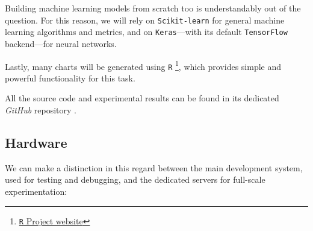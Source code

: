		Building machine learning models from scratch too is understandably out of the question. For this reason, we will rely on \texttt{Scikit-learn} for general machine learning algorithms and metrics, and on \texttt{Keras}---with its default \texttt{TensorFlow} backend---for neural networks.

		Lastly, many charts will be generated using \texttt{R} \footnote{\href{https://www.r-project.org/}{\texttt{R} Project website}}, which provides simple and powerful functionality for this task.

		All the source code and experimental results can be found in its dedicated \textit{GitHub} repository \cite{githubrepo}.

	\subsection{Hardware}

		We can make a distinction in this regard between the main development system, used for testing and debugging, and the dedicated servers for full-scale experimentation:

